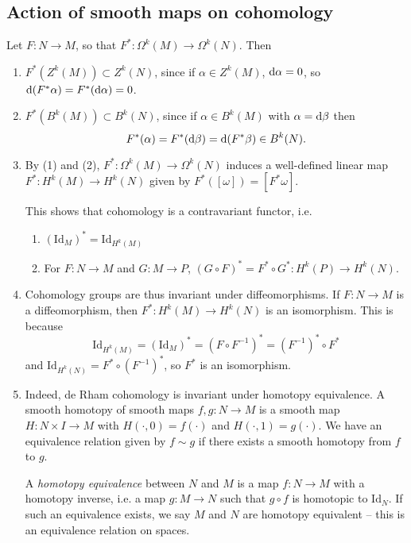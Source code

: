 \subsection{Action of smooth maps on cohomology}
Let $F: N \to M$, so that $F^\ast : \Omega^k(M) \to \Omega^k(N)$. Then
\begin{enumerate}
  \item{
    $F^\ast(Z^k(M)) \subset Z^k(N)$, since if $\alpha \in Z^k(M)$,
    $\mathop{}\!\mathrm{d} \alpha = 0$, so $\mathop{}\!\mathrm{d}(F^\ast \alpha) = F^\ast (\mathop{}\!\mathrm{d} \alpha)
    = 0$.
  }
  \item{
    $F^\ast(B^k(M)) \subset B^k(N)$, since if $\alpha \in B^k(M)$ with
    $\alpha = \mathop{}\!\mathrm{d} \beta$ then
    $$
    F^\ast(\alpha) = F^\ast(\mathop{}\!\mathrm{d} \beta) = \mathop{}\!\mathrm{d} (F^\ast \beta) \in B^k(N).
    $$
  }
  \item{
    By (1) and (2),
    $F^\ast : \Omega^k(M) \to \Omega^k(N)$ induces a well-defined
    linear map $F^\ast : H^k(M) \to H^k(N)$ given by
    $F^\ast([\omega]) = [F^\ast \omega]$.

    This shows that cohomology is a contravariant functor, i.e.
    \begin{enumerate}
      \item{
        $(\mathrm{Id}_M)^\ast = \mathrm{Id}_{H^k(M)}$
      }
      \item{
        For $F: N \to M$ and $G: M \to P$,
        $(G \circ F)^\ast = F^\ast \circ G^\ast : H^k(P) \to H^k(N)$.
      }
    \end{enumerate}
  }
  \item{
    Cohomology groups are thus invariant under diffeomorphisms. If
    $F: N \to M$ is a diffeomorphism, then $F^\ast: H^k(M) \to H^k(N)$
    is an isomorphism. This is because
    $$
      \mathrm{Id}_{H^k(M)}
    = (\mathrm{Id}_M)^\ast
    = (F \circ F^{-1})^\ast
    = (F^{-1})^\ast \circ F^\ast
    $$
    and $\mathrm{Id}_{H^k(N)} = F^\ast \circ (F^{-1})^\ast$, so
    $F^\ast$ is an isomorphism.
  }
  \item{
    Indeed, de Rham cohomology is invariant under homotopy
    equivalence. A smooth homotopy of smooth maps
    $f, g: N \to M$ is a smooth map $H : N \times I \to M$ with
    $H(\cdot, 0) = f(\cdot)$ and $H(\cdot, 1) = g(\cdot)$.
    We have an equivalence relation given by $f \sim g$ if there
    exists a smooth homotopy from $f$ to $g$.

    A \emph{homotopy equivalence} between $N$ and $M$ is a map $f: N \to M$ with a
    homotopy inverse, i.e. a map $g : M \to N$ such that
    $g \circ f$ is homotopic to $\mathrm{Id}_N$. If such an
    equivalence exists, we say $M$ and $N$ are homotopy equivalent --
    this is an equivalence relation on spaces.

}
\end{enumerate}
